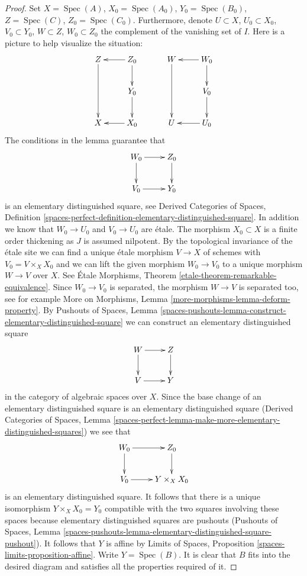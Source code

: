 \documentclass[10pt,a4paper]{amsart}
\theoremstyle{plain}
\theoremstyle{definition}
\theoremstyle{remark}
\numberwithin{equation}{subsection}
\def\Spec{\mathop{\mathrm{Spec}}}
\begin{document}
\begin{proof}
Set $X = \Spec(A)$, $X_0 = \Spec(A_0)$, $Y_0 = \Spec(B_0)$,
$Z = \Spec(C)$, $Z_0 = \Spec(C_0)$. Furthermore, denote
$U \subset X$, $U_0 \subset X_0$, $V_0 \subset Y_0$,
$W \subset Z$, $W_0 \subset Z_0$ the complement of the
vanishing set of $I$. Here is a picture to help visualize the
situation:
$$
\xymatrix{
Z \ar[dd] & Z_0 \ar[l] \ar[d] \\
& Y_0 \ar[d] \\
X & X_0 \ar[l]
}
\quad\quad\quad
\xymatrix{
W \ar[dd] & W_0 \ar[l] \ar[d] \\
& V_0 \ar[d] \\
U & U_0 \ar[l]
}
$$
The conditions in the lemma guarantee that
$$
\xymatrix{
W_0 \ar[r] \ar[d] & Z_0 \ar[d] \\
V_0 \ar[r] & Y_0
}
$$
is an elementary distinguished square, see
Derived Categories of Spaces, Definition
\ref{spaces-perfect-definition-elementary-distinguished-square}.
In addition we know that
$W_0 \to U_0$ and $V_0 \to U_0$ are \'etale. The morphism
$X_0 \subset X$ is a finite order thickening as $J$ is assumed nilpotent.
By the topological invariance of the \'etale site
we can find a unique \'etale morphism $V \to X$ of schemes
with $V_0 = V \times_X X_0$ and we can lift the given morphism
$W_0 \to V_0$ to a unique morphism $W \to V$ over $X$.
See \'Etale Morphisms, Theorem
\ref{etale-theorem-remarkable-equivalence}.
Since $W_0 \to V_0$ is separated, the morphism $W \to V$ is separated too,
see for example
More on Morphisms, Lemma \ref{more-morphisms-lemma-deform-property}.
By Pushouts of Spaces, Lemma
\ref{spaces-pushouts-lemma-construct-elementary-distinguished-square}
we can construct an elementary distinguished square
$$
\xymatrix{
W \ar[r] \ar[d] & Z \ar[d] \\
V \ar[r] & Y
}
$$
in the category of algebraic spaces over $X$. Since the base change
of an elementary distinguished square is an elementary distinguished
square (Derived Categories of Spaces, Lemma
\ref{spaces-perfect-lemma-make-more-elementary-distinguished-squares})
we see that
$$
\xymatrix{
W_0 \ar[r] \ar[d] & Z_0 \ar[d] \\
V_0 \ar[r] & Y \times_X X_0
}
$$
is an elementary distinguished square. It follows that there is a
unique isomorphism $Y \times_X X_0 = Y_0$ compatible with the two
squares involving these spaces because
elementary distinguished squares are pushouts (Pushouts of Spaces, Lemma
\ref{spaces-pushouts-lemma-elementary-distinguished-square-pushout}).
It follows that $Y$ is affine by
Limits of Spaces, Proposition \ref{spaces-limits-proposition-affine}.
Write $Y = \Spec(B)$. It is clear that $B$ fits into the desired diagram
and satisfies all the properties required of it.
\end{proof}
\end{document}
